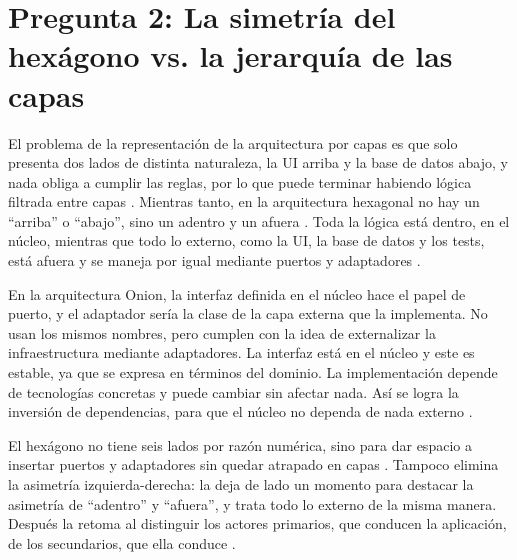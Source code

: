 \section{Pregunta 2: La simetría del hexágono vs. la jerarquía de las capas}


El problema de la representación de la arquitectura por capas es que solo presenta dos lados de distinta naturaleza, la UI arriba y la base de datos abajo, y nada obliga a cumplir las reglas, por lo que puede terminar habiendo lógica filtrada entre capas \parencite{cockburn2005}. Mientras tanto, en la arquitectura hexagonal no hay un ``arriba'' o ``abajo'', sino un adentro y un afuera \parencite{cockburn2005}. Toda la lógica está dentro, en el núcleo, mientras que todo lo externo, como la UI, la base de datos y los tests, está afuera y se maneja por igual mediante puertos y adaptadores \parencite{cockburn2005}.

En la arquitectura Onion, la interfaz definida en el núcleo hace el papel de puerto, y el adaptador sería la clase de la capa externa que la implementa. No usan los mismos nombres, pero cumplen con la idea de externalizar la infraestructura mediante adaptadores. La interfaz está en el núcleo y este es estable, ya que se expresa en términos del dominio. La implementación depende de tecnologías concretas y puede cambiar sin afectar nada. Así se logra la inversión de dependencias, para que el núcleo no dependa de nada externo \parencite{palermo2008, martin2017}.

El hexágono no tiene seis lados por razón numérica, sino para dar espacio a insertar puertos y adaptadores sin quedar atrapado en capas \parencite{cockburn2005}. Tampoco elimina la asimetría izquierda-derecha: la deja de lado un momento para destacar la asimetría de ``adentro'' y ``afuera'', y trata todo lo externo de la misma manera. Después la retoma al distinguir los actores primarios, que conducen la aplicación, de los secundarios, que ella conduce \parencite{cockburn2005}.